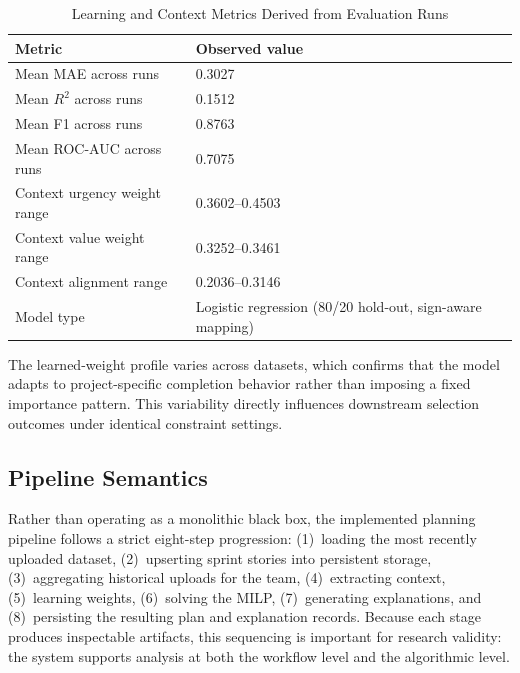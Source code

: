\documentclass[conference]{IEEEtran}
\begin{document}
\begin{table}[t]
	\caption{Learning and Context Metrics Derived from Evaluation Runs}
	\label{tab:learning-metrics}
	\centering\small
	\begin{tabularx}{\columnwidth}{lY}
		\toprule
		Metric                       & Observed value                                           \\
		\midrule
		Mean MAE across runs         & 0.3027                                                   \\
		Mean $R^2$ across runs       & 0.1512                                                   \\
		Mean F1 across runs          & 0.8763                                                   \\
		Mean ROC-AUC across runs     & 0.7075                                                   \\
		Context urgency weight range & 0.3602--0.4503                                           \\
		Context value weight range   & 0.3252--0.3461                                           \\
		Context alignment range      & 0.2036--0.3146                                           \\
		Model type                   & Logistic regression (80/20 hold-out, sign-aware mapping) \\
		\bottomrule
	\end{tabularx}
\end{table}

The learned-weight profile varies across datasets, which confirms that the model
adapts to project-specific completion behavior rather than imposing a fixed
importance pattern. This variability directly influences downstream selection
outcomes under identical constraint settings.

\subsection{Pipeline Semantics}

Rather than operating as a monolithic black box, the implemented planning pipeline
follows a strict eight-step progression: (1)~loading the most recently uploaded
dataset, (2)~upserting sprint stories into persistent storage, (3)~aggregating
historical uploads for the team, (4)~extracting context, (5)~learning weights,
(6)~solving the MILP, (7)~generating explanations, and (8)~persisting the resulting
plan and explanation records.
Because each stage produces inspectable artifacts, this sequencing is important for
research validity: the system supports analysis at both the workflow level and the
algorithmic level.
\end{document}
